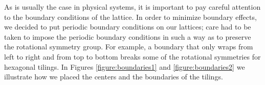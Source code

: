 \documentclass[12pt]{amsbook}
\theoremstyle{plain}
\theoremstyle{definition}
\theoremstyle{remark}
\begin{document}
As is usually the case in physical systems, it is important to pay careful attention to the boundary conditions of the lattice.  In order to minimize boundary effects, we decided to put periodic boundary conditions on our lattices;  care had to be taken to impose the periodic boundary conditions in such a way as to preserve the rotational symmetry group.  For example, a boundary that only wraps from left to right and from top to bottom breaks some of the rotational symmetries for hexagonal tilings.  In Figures \ref{figure:boundaries1}  and \ref{figure:boundaries2} we illustrate how we placed the centers and the boundaries of the tilings.

\begin{figure}
\centering
{}
\\

\end{figure}
\end{document}
